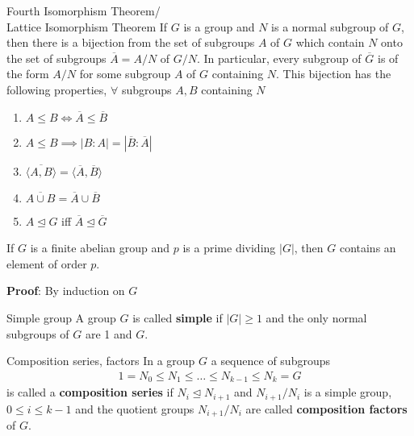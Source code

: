\documentclass[titlepage, 12pt]{book}
\begin{document}
\begin{theorem}{Fourth Isomorphism Theorem/\\Lattice Isomorphism Theorem}{}
    If $G$ is a group and $N$ is a normal subgroup of $G$, then there is a
    bijection from the set of subgroups $A$ of $G$ which contain $N$ onto the
    set of subgroups $\overline A = A/N$ of $G/N$. In particular, every subgroup
    of $\overline G$ is of the form $A/N$ for some subgroup $A$ of $G$
    containing $N$. This bijection has the following properties, $\forall$
    subgroups $A, B$ containing $N$
    \begin{enumerate}
        \item $A\le B \iff \overline A\le\overline B$
        \item $A\le B\implies |B:A| = |\overline B:\overline A|$
        \item $\overline{\langle A, B\rangle} = \langle\overline A, \overline
            B\rangle$
        \item $\overline{A\cup B} = \overline A\cup\overline B$
        \item $A\trianglelefteq G$ iff $\overline A\trianglelefteq\overline G$
    \end{enumerate}
\end{theorem}
\begin{proposition}{}{}
    If $G$ is a finite abelian group and $p$ is a prime dividing $|G|$, then $G$
    contains an element of order $p$.
\end{proposition}
\textbf{Proof}: By induction on $G$
\begin{definition}{Simple group}{}
    A group $G$ is called \textbf{simple} if $|G|\ge 1$ and the only normal
    subgroups of $G$ are 1 and $G$.
\end{definition}
\begin{definition}{Composition series, factors}{}
    In a group $G$ a sequence of subgroups
    \begin{gather*}
        1 = N_0\le N_1\le\dots\le N_{k-1}\le N_k = G
    \end{gather*}
    is called a \textbf{composition series} if $N_i\trianglelefteq N_{i+1}$ and
    $N_{i+1}/N_i$ is a simple group, $0\le i\le k-1$ and the quotient groups
    $N_{i+1}/N_i$ are called \textbf{composition factors} of $G$.
\end{definition}
\end{document}
